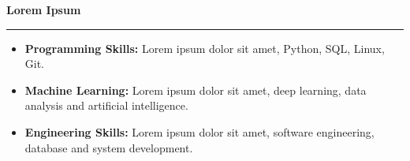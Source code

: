 \documentclass[11pt,a4paper]{article}
\newcommand{\resumeSection}[1]{
\vspace{8pt}

\noindent
{\large\bfseries #1}

\vspace{3pt}

\noindent
\hrule

\vspace{8pt}
}
\begin{document}
\resumeSection{Lorem Ipsum}

\begin{itemize}[
leftmargin=1.2em,
labelsep=0.5em,
itemsep=1pt,
topsep=0pt,
parsep=0pt
]

\item
\textbf{Programming Skills:}
Lorem ipsum dolor sit amet, Python, SQL, Linux, Git.

\item
\textbf{Machine Learning:}
Lorem ipsum dolor sit amet, deep learning,
data analysis and artificial intelligence.

\item
\textbf{Engineering Skills:}
Lorem ipsum dolor sit amet, software engineering,
database and system development.

\end{itemize}
\end{document}
